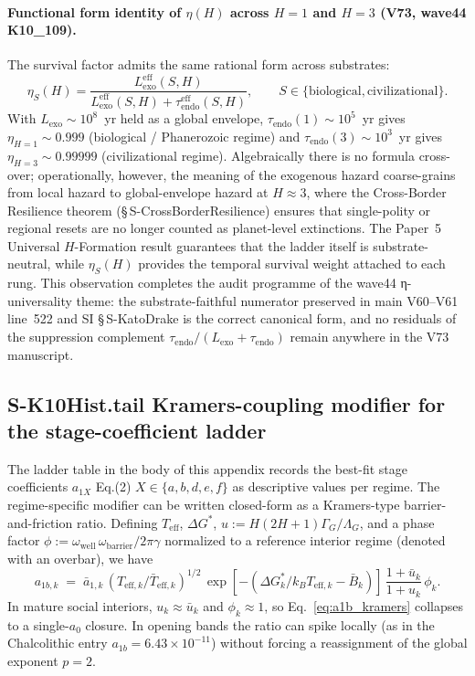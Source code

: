\documentclass[11pt]{article}
\begin{document}
\paragraph{Functional form identity of $\eta(H)$ across $H{=}1$ and $H{=}3$ (V73, wave44 K10\_109).}\label{S-EtaUniversality}
The survival factor admits the same rational form across substrates:
\[
\eta_S(H)=\frac{L_{\mathrm{exo}}^{\mathrm{eff}}(S,H)}{L_{\mathrm{exo}}^{\mathrm{eff}}(S,H)+\tau_{\mathrm{endo}}^{\mathrm{eff}}(S,H)},\qquad S\in\{\mathrm{biological},\mathrm{civilizational}\}.
\]
With $L_{\mathrm{exo}}\sim10^{8}$~yr held as a global envelope, $\tau_{\mathrm{endo}}(1)\sim10^{5}$~yr gives $\eta_{H=1}\sim 0.999$ (biological / Phanerozoic regime) and $\tau_{\mathrm{endo}}(3)\sim10^{3}$~yr gives $\eta_{H=3}\sim 0.99999$ (civilizational regime). Algebraically there is no formula cross-over; operationally, however, the meaning of the exogenous hazard coarse-grains from local hazard to global-envelope hazard at $H\approx 3$, where the Cross-Border Resilience theorem (\S\,S-CrossBorderResilience) ensures that single-polity or regional resets are no longer counted as planet-level extinctions. The Paper~5 Universal $H$-Formation result guarantees that the ladder itself is substrate-neutral, while $\eta_S(H)$ provides the temporal survival weight attached to each rung. This observation completes the audit programme of the wave44 η-universality theme: the substrate-faithful numerator preserved in main V60--V61 line~522 and SI \S\,S-KatoDrake is the correct canonical form, and no residuals of the suppression complement $\tau_{\mathrm{endo}}/(L_{\mathrm{exo}}{+}\tau_{\mathrm{endo}})$ remain anywhere in the V73 manuscript.


\subsection*{S-K10Hist.tail Kramers-coupling modifier for the stage-coefficient ladder}
\label{sec:S-K10Hist-a1b-kramers}

The ladder table in the body of this appendix records the best-fit
stage coefficients $a_{1X}$ Eq.(2) $X\in\{a,b,d,e,f\}$ as descriptive
values per regime. The regime-specific modifier can be written closed-form
as a Kramers-type barrier-and-friction ratio. Defining $T_{\mathrm{eff}}$,
$\Delta G^\ast$, $u:=H(2H+1)\Gamma_G/\Lambda_G$, and a phase factor
$\phi:=\omega_{\mathrm{well}}\,\omega_{\mathrm{barrier}}/2\pi\gamma$
normalized to a reference interior regime (denoted with an overbar), we
have
\begin{equation}
a_{1b,k} \;=\; \bar{a}_{1,k}\,
  (T_{\mathrm{eff},k}/\bar{T}_{\mathrm{eff},k})^{1/2}\,
  \exp\!\left[-(\Delta G^\ast_k/k_B T_{\mathrm{eff},k} - \bar{B}_k)\right]\,
  \frac{1+\bar{u}_k}{1+u_k}\,\phi_k.
\label{eq:a1b_kramers}
\end{equation}
In mature social interiors, $u_k\approx \bar{u}_k$ and $\phi_k\approx 1$,
so Eq.~\eqref{eq:a1b_kramers} collapses to a single-$a_0$ closure. In
opening bands the ratio can spike locally (as in the Chalcolithic entry
$a_{1b}=6.43\times 10^{-11}$) without forcing a reassignment of the global
exponent $p=2$.
\end{document}
